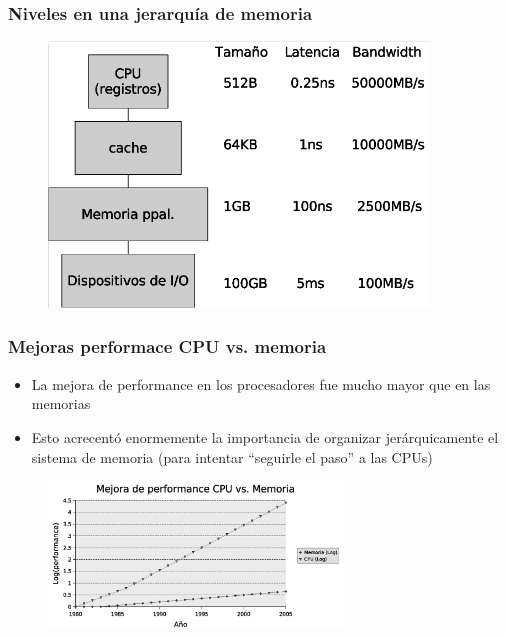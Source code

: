 \documentclass{beamer}
\begin{document}
  \begin{frame}
  \frametitle{Niveles en una jerarquía de memoria}
    \begin{figure}[ht]
    \centering
    \includegraphics[width=0.9\textwidth]{mh_levels.png}
    \end{figure}
  \end{frame}

  \begin{frame}
   \frametitle{Mejoras performace CPU vs. memoria}
    \begin{itemize}
      \item La mejora de performance en los procesadores fue mucho mayor que en
      las memorias
      \item Esto acrecentó enormemente la importancia de organizar
      jerárquicamente el sistema de memoria (para intentar ``seguirle el paso''
      a las CPUs)
    \end{itemize}

    \begin{figure}[ht]
    \centering
    \includegraphics[width=0.7\textwidth]{cpu_mem_perf.png}
    \end{figure}
    \end{frame}
\end{document}
